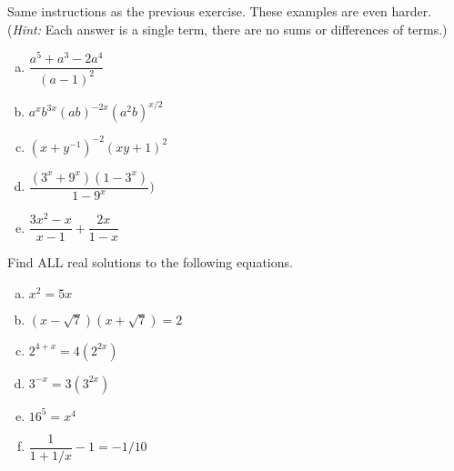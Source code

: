 \begin{exercise}{9}
Same instructions as the previous exercise. These examples are even harder. (\emph{Hint:} Each answer is a single term, there are no sums or differences of terms.)
\begin{multicols}{2}
\begin{enumerate}[(a)]
\item
$\dfrac{a^5 +a^3 - 2a^4}{(a-1)^2}$
\item
$a^x b^{3x}(ab)^{-2x}(a^2 b)^{x/2}$
\item
$(x+y^{-1})^{-2}(xy+1)^2$
\item
$\dfrac{(3^x+9^x)(1-3^x)}{1-9^x})$
\item
$\dfrac{3x^2 - x}{x-1} + \dfrac{2x}{1-x}$

\end{enumerate}
\end{multicols}
\end{exercise}

\begin{exercise}{10}
Find ALL  real solutions to the following equations. 
\begin{multicols}{2}
\begin{enumerate}[(a)]
\item
$x^2 = 5x$
\item
$(x - \sqrt{7})(x+\sqrt{7}) = 2$
\item
$2^{4+x} = 4(2^{2x})$
\item
$3^{-x} = 3(3^{2x})$
\item
$16^5 = x^4$
\item
$\dfrac{1}{1 + 1/x} -1= -1/10$
\end{enumerate}
\end{multicols}
\end{exercise}
